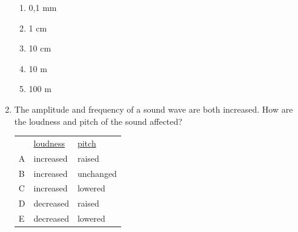 \begin{enumerate}[noitemsep, label=\textbf{\arabic*}. ]
\label{m38800*id186650}\begin{enumerate}[noitemsep, label=\textbf{\alph*}. ] 
            \label{m38800*uid60}\item 0,1 mm
\label{m38800*uid61}\item 1 cm
\label{m38800*uid62}\item 10 cm
\label{m38800*uid63}\item 10 m
\label{m38800*uid64}\item 100 m
\end{enumerate}
                \label{m38800*uid65}\item The amplitude and frequency of a sound wave are both increased. How are the loudness and pitch of the sound affected?
          \begin{table}[H]
        \begin{center}
      \label{m38800*id186726}
    \noindent
      \tablelasttail{}
      \begin{xtabular}[t]{|l|l|l|}\hline
         &
        \uline{loudness} &
        \uline{pitch}%
     \tabularnewline{}
        A &
        increased &
        raised%
     \tabularnewline{}
        B &
        increased &
        unchanged%
     \tabularnewline{}
        C &
        increased &
        lowered%
     \tabularnewline{}
        D &
        decreased &
        raised%
     \tabularnewline{}
        E &
        decreased &
        lowered%
     \tabularnewline{}

\end{xtabular}
\end{center}
\end{table}
\end{enumerate}
